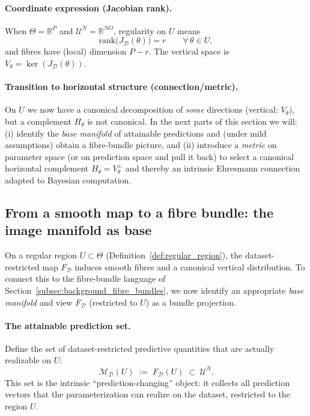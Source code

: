 \paragraph{Coordinate expression (Jacobian rank).}
When $\Theta=\mathbb R^P$ and $\mathcal U^N=\mathbb R^{NO}$, regularity on $U$ means
\[
\mathrm{rank}\bigl(J_{\mathcal D}(\theta)\bigr)=r
\qquad\forall\,\theta\in U,
\]
and fibres have (local) dimension $P-r$. The vertical space is $V_\theta=\ker(J_{\mathcal D}(\theta))$.

\paragraph{Transition to horizontal structure (connection/metric).}
On $U$ we now have a canonical decomposition of \emph{some} directions (vertical: $V_\theta$),
but a complement $H_\theta$ is not canonical. In the next parts of this section we will:
(i) identify the \emph{base manifold} of attainable predictions and (under mild assumptions) obtain a
fibre-bundle picture, and (ii) introduce a \emph{metric} on parameter space (or on prediction space and pull it back)
to select a canonical horizontal complement $H_\theta=V_\theta^{\perp}$ and thereby an intrinsic Ehresmann
connection adapted to Bayesian computation.

\subsection{From a smooth map to a fibre bundle: the image manifold as base}
\label{subsec:bundle_from_dataset_map}

On a regular region $U\subset\Theta$ (Definition~\ref{def:regular_region}),
the dataset-restricted map $F_{\mathcal D}$ induces smooth fibres and a canonical vertical
distribution.  To connect this to the fibre-bundle language of
Section~\ref{subsec:background_fibre_bundles}, we now identify an appropriate \emph{base manifold}
and view $F_{\mathcal D}$ (restricted to $U$) as a bundle projection.

\paragraph{The attainable prediction set.}
Define the set of dataset-restricted predictive quantities that are actually realizable on $U$:
\[
\mathcal M_{\mathcal D}(U) \;:=\; F_{\mathcal D}(U)\;\subset\;\mathcal U^N.
\]
This set is the intrinsic ``prediction-changing'' object: it collects all prediction vectors
that the parameterization can realize on the dataset, restricted to the region $U$.

